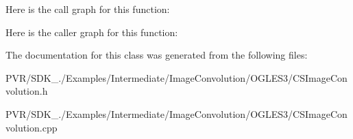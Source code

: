 Here is the call graph for this function\+:




Here is the caller graph for this function\+:




The documentation for this class was generated from the following files\+:\begin{DoxyCompactItemize}
\item 
P\+V\+R/\+S\+D\+K\+\_./\+Examples/\+Intermediate/\+Image\+Convolution/\+O\+G\+L\+E\+S3/C\+S\+Image\+Convolution.\+h\item 
P\+V\+R/\+S\+D\+K\+\_./\+Examples/\+Intermediate/\+Image\+Convolution/\+O\+G\+L\+E\+S3/C\+S\+Image\+Convolution.\+cpp\end{DoxyCompactItemize}
